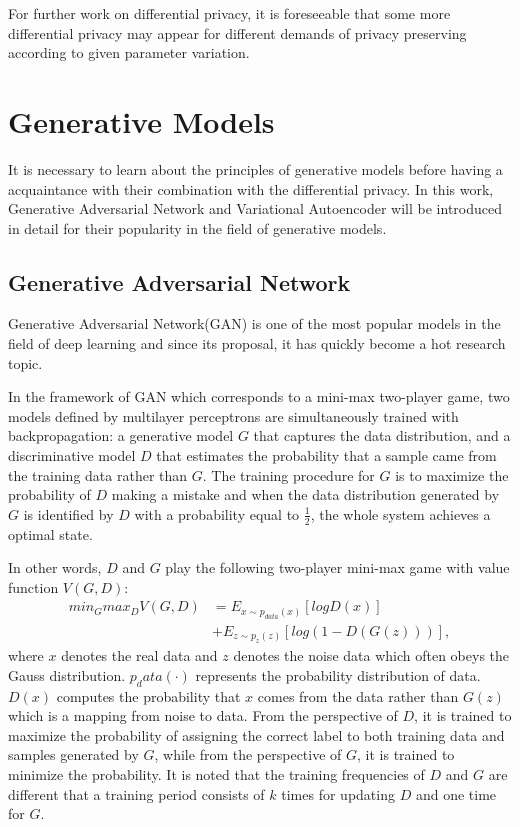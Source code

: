 \documentclass[conference]{IEEEtran}
\begin{document}
For further work on differential privacy, it is foreseeable that some more differential privacy may appear for different demands of privacy preserving according to given parameter variation.

\section{Generative Models}
It is necessary to learn about the principles of generative models before having a acquaintance with their combination with the differential privacy. In this work, Generative Adversarial Network and Variational Autoencoder will be introduced in detail for their popularity in the field of generative models.

\subsection{Generative Adversarial Network\cite{b32}}
Generative Adversarial Network(GAN) is one of the most popular models in the field of deep learning and since its proposal, it has quickly become a hot research topic.

In the framework of GAN which corresponds to a mini-max two-player game, two models defined by multilayer perceptrons are simultaneously trained with backpropagation: a generative model $G$ that captures the data distribution, and a discriminative model $D$ that estimates the probability that a sample came from the training data rather than $G$. The training procedure for $G$ is to maximize the probability of $D$ making a mistake and when the data distribution generated by $G$ is identified by $D$ with a probability equal to $\frac{1}{2}$, the whole system achieves a optimal state.

In other words, $D$ and $G$ play the following two-player mini-max game with value function $V(G, D)$:
\begin{equation}
    \begin{split}
        min_Gmax_DV(G, D) &= E_{x \sim p_{data}(x)}[logD(x)]\\ 
        &+ E_{z \sim p_{z}(z)}[log(1-D(G(z)))],
    \end{split}
\end{equation}
where $x$ denotes the real data and $z$ denotes the noise data which often obeys the Gauss distribution. $p_data(\cdot)$ represents the probability distribution of data. $D(x)$ computes the probability that $x$ comes from the data rather than $G(z)$ which is a mapping from noise to data. From the perspective of $D$, it is trained to maximize the probability of assigning the correct label to both training data and samples generated by $G$, while from the perspective of $G$, it is trained to minimize the probability. It is noted that the training frequencies of $D$ and $G$ are different that a training period consists of $k$ times for updating $D$ and one time for $G$.
\end{document}
